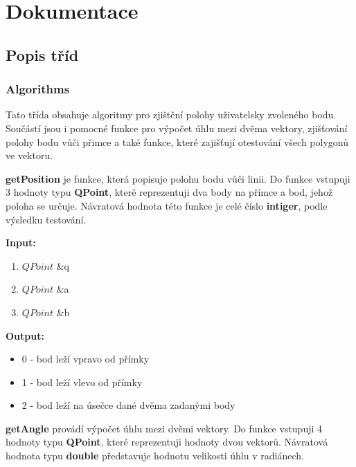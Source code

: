 \documentclass{article}
\begin{document}
\newpage 

 

\section{Dokumentace} 

 

\subsection{Popis tříd} 

 

\subsubsection{Algorithms} 


 
Tato třída obsahuje algoritmy pro zjištění polohy uživatelsky zvoleného bodu. Součástí jsou i pomocné funkce pro výpočet úhlu mezi dvěma vektory, zjišťování polohy bodu vůči přimce a také funkce, které zajišťují otestování všech polygonů ve vektoru.\\ 

\bigskip 

\textbf{getPosition} je funkce, která popisuje polohu bodu vůči linii. Do funkce vstupuji 3 hodnoty typu  \textbf{QPoint}, které reprezentuji dva body na přímce a bod, jehož poloha se určuje. Návratová hodnota této funkce je celé číslo \textbf{intiger}, podle výsledku testování.\\ 
\bigskip 

\textbf{Input:}
\begin{enumerate} 
\item $QPoint$ \&q
\item $QPoint$ \&a
\item $QPoint$ \&b
\end{enumerate}

\bigskip 
\textbf{Output:}
\begin{itemize} 
\item 0 - bod leží vpravo od přímky
\item 1 - bod leží vlevo od přímky
\item 2 - bod leží na úsečce dané dvěma zadanými body

\end{itemize}

\bigskip 

\textbf{getAngle} provádí výpočet úhlu mezi dvěmi vektory. Do funkce vstupuji 4 hodnoty typu \textbf{QPoint}, které reprezentuji hodnoty dvou vektorů. Návratová hodnota typu \textbf{double} představuje hodnotu velikosti úhlu v radiánech.\\ 
\bigskip 
\end{document}
